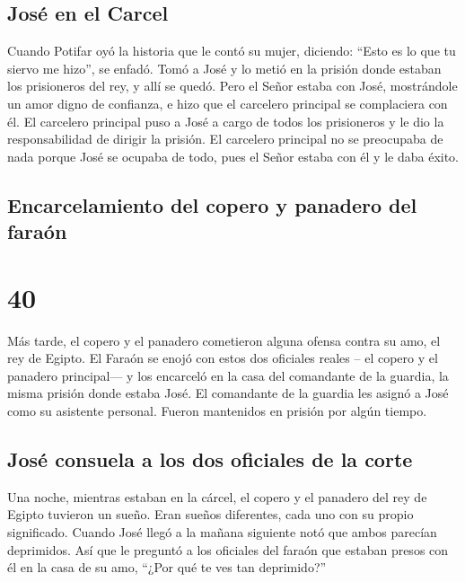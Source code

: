 \hypertarget{josuxe9-en-el-carcel}{%
\subsection{José en el Carcel}\label{josuxe9-en-el-carcel}}

 Cuando Potifar oyó la historia que le contó su mujer,
diciendo: ``Esto es lo que tu siervo me hizo'', se enfadó.
 Tomó a José y lo metió en la prisión donde estaban los
prisioneros del rey, y allí se quedó.  Pero el Señor
estaba con José, mostrándole un amor digno de confianza, e hizo que el
carcelero principal se complaciera con él.  El carcelero
principal puso a José a cargo de todos los prisioneros y le dio la
responsabilidad de dirigir la prisión.  El carcelero
principal no se preocupaba de nada porque José se ocupaba de todo, pues
el Señor estaba con él y le daba éxito.

\hypertarget{encarcelamiento-del-copero-y-panadero-del-farauxf3n}{%
\subsection{Encarcelamiento del copero y panadero del
faraón}\label{encarcelamiento-del-copero-y-panadero-del-farauxf3n}}

\hypertarget{section-39}{%
\section{40}\label{section-39}}

 Más tarde, el copero y el panadero cometieron alguna
ofensa contra su amo, el rey de Egipto.  El Faraón se
enojó con estos dos oficiales reales -- el copero y el panadero
principal---  y los encarceló en la casa del comandante de
la guardia, la misma prisión donde estaba José.  El
comandante de la guardia les asignó a José como su asistente personal.
Fueron mantenidos en prisión por algún tiempo.

\hypertarget{josuxe9-consuela-a-los-dos-oficiales-de-la-corte}{%
\subsection{José consuela a los dos oficiales de la
corte}\label{josuxe9-consuela-a-los-dos-oficiales-de-la-corte}}

 Una noche, mientras estaban en la cárcel, el copero y el
panadero del rey de Egipto tuvieron un sueño. Eran sueños diferentes,
cada uno con su propio significado.  Cuando José llegó a
la mañana siguiente notó que ambos parecían deprimidos. 
Así que le preguntó a los oficiales del faraón que estaban presos con él
en la casa de su amo, ``¿Por qué te ves tan deprimido?''

